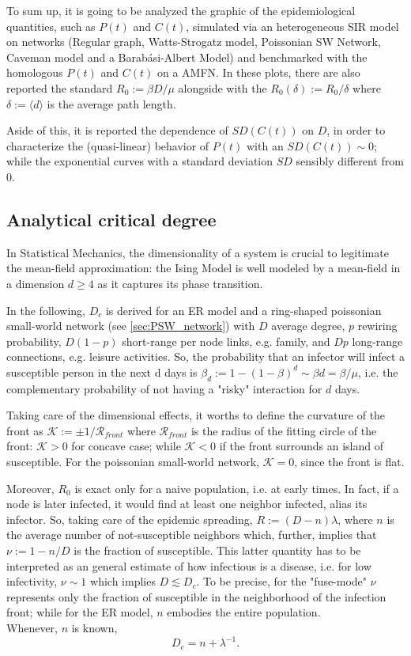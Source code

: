 \documentclass[a4paper,10pt,twoside]{book} %
\theoremstyle{definition}
\begin{document}
To sum up, it is going to be analyzed the graphic of the epidemiological quantities, such as $P(t)$ and $C(t)$, simulated via an heterogeneous SIR model on networks (Regular graph, Watts-Strogatz model, Poissonian SW Network, Caveman model and a Barabási-Albert Model) and benchmarked with the homologous $P(t)$ and $C(t)$ on a AMFN. In these plots, there are also reported the standard $R_0 := \beta D / \mu$ alongside with the $R_0(\delta) := R_0 /\delta$ where $\delta:=\langle d \rangle $ is the average path length.

Aside of this, it is reported the dependence of $SD(C(t))$ on $D$, in order to characterize the (quasi-linear) behavior of $P(t)$ with an $SD(C(t)) \sim 0$; while the exponential curves with a standard deviation $SD$ sensibly different from $0$.

\subsection*{Analytical critical degree}
In Statistical Mechanics, the dimensionality of a system is crucial to legitimate the mean-field approximation: the Ising Model is well modeled by a mean-field in a dimension $d \geq 4$ as it captures its phase transition.

In the following, $D_c$ is derived for an ER model and a ring-shaped poissonian small-world network (see \autoref{sec:PSW_network}) with $D$ average degree, $p$ rewiring probability, $D(1-p)$ short-range per node links, e.g. family, and $Dp$ long-range connections, e.g. leisure activities. So, the probability that an infector will infect a susceptible person in the next d days is $\beta_d:= 1-(1-\beta)^d \sim \beta d = \beta/\mu$, i.e. the complementary probability of not having a "risky" interaction for $d$ days.

Taking care of the dimensional effects, it worths to define the curvature of the front as $ \mathcal{K}:= \pm 1/\mathcal{R}_{front}$ where $\mathcal{R}_{front}$ is the radius of the fitting circle of the front: $\mathcal{K}>0$ for concave case; while $\mathcal{K}<0$ if the front surrounds an island of susceptible. For the poissonian small-world network, $\mathcal{K} = 0$, since the front is flat.    

Moreover, $R_0$ is exact only for a naive population, i.e. at early times. In fact, if a node is later infected, it would find at least one neighbor infected, alias its infector. So, taking care of the epidemic spreading, $R := (D-n)\lambda$, where $n$ is the average number of not-susceptible neighbors which, further, implies that $\nu := 1 - n/D$ is the fraction of susceptible. This latter quantity has to be interpreted as an general estimate of how infectious is a disease, i.e. for low infectivity, $\nu\sim1$ which implies $D \lesssim D_c$.
To be precise, for the "fuse-mode" $\nu$ represents only the fraction of susceptible in the neighborhood of the infection front; while for the ER model, $n$ embodies the entire population.
\\Whenever, $n$ is known, 
\begin{equation}
	D_c = n + \lambda^{-1}.
	\label{eq:D_c_analytical_discussion}
\end{equation}   
\end{document}
